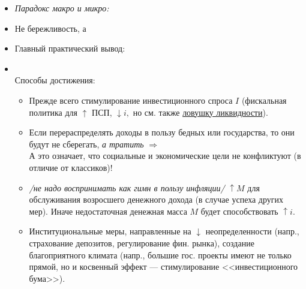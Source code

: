 \documentclass[a4paper]{article}
\begin{document}
\begin{itemize}
\item \emph{Парадокс макро и микро:} 
\item Не бережливость, а 
\item Главный практический вывод: 
\item {}\\[.1cm] Способы достижения:
\begin{itemize}
\item Прежде всего стимулирование инвестиционного спроса $I$ (фискальная политика для $\uparrow$ ПСП,
$\downarrow i,$ но см. также \href{http://ru.wikipedia.org/wiki/\%D0\%9B\%D0\%BE\%D0\%B2\%D1\%83\%D1\%88\%D0\%BA\%D0\%B0_\%D0\%BB\%D0\%B8\%D0\%BA\%D0\%B2\%D0\%B8\%D0\%B4\%D0\%BD\%D0\%BE\%D1\%81\%D1\%82\%D0\%B8}{ловушку ликвидности}).
\item Если перераспределять доходы в пользу бедных или государства, то они будут не сберегать, \emph{а тратить} $\Rightarrow$ 
\\ А это означает, что социальные и экономические цели не конфликтуют (в отличие от классиков)!
\item \textsl{\small/не надо воспринимать как гимн в пользу инфляции/} $\uparrow M$ для обслуживания возросшего денежного дохода (в случае успеха других мер). Иначе недостаточная денежная масса $M$ будет способствовать $\uparrow i.$
\item Институциональные меры, направленные на $\downarrow$ неопределенности (напр., страхование депозитов, регулирование фин. рынка), создание благоприятного климата (напр., большие гос. проекты
имеют не только прямой, но и косвенный эффект --- стимулирование <<инвестиционного бума>>).
\end{itemize}
\end{itemize}
\end{document}
